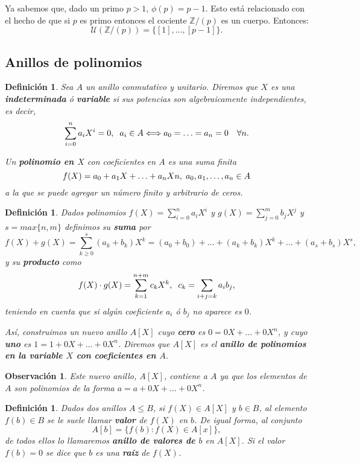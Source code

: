 \documentclass[12pt]{article}
\newtheorem{definition}[theorem]{Definición}
\newtheorem{observation}{Observación}[theorem]
\begin{document}
Ya sabemos que, dado un primo $p>1$, $\phi(p) = p-1$. Esto está relacionado con el hecho de que si $p$ es primo entonces el cociente $\mathbb{Z}/(p)$ es un cuerpo. Entonces: $$\mathcal{U}(\mathbb{Z}/(p)) = \lbrace [1], \ldots, [p-1] \rbrace.$$

\subsection{Anillos de polinomios}

\begin{definition}Sea $A$ un anillo conmutativo y unitario. Diremos que $X$ es una \textbf{indeterminada} ó \textbf{variable} si sus potencias son algebraicamente independientes, es decir, $$\sum_{i=0}^{n} a_{i}X^{i}=0, \hspace{0.2cm} a_{i}\in A \Longleftrightarrow a_0 = \ldots = a_n = 0  \quad\forall n.$$

Un \textbf{polinomio en $X$} con coeficientes en $A$ es una suma finita $$f(X) = a_0+a_1X+\ldots + a_nXn, \hspace{0.1cm} a_0, a_1, \ldots, a_n \in A$$ a la que se puede agregar un número finito y arbitrario de ceros.  
\end{definition}

\begin{definition}Dados polinomios $f(X) = \sum_{i=0}^n a_iX^i$ y $g(X) = \sum_{j=0}^m b_jX^j$ y $s = max\lbrace n,m \rbrace$ definimos su \textbf{suma} por $$f(X) +g(X) = \sum_{k\geq 0}^s(a_k+b_k)X^k = (a_0+b_0)+\ldots + (a_k+b_k)X^k + \ldots + (a_s+b_s)X^s,$$
y su \textbf{producto} como $$f(X)\cdot g(X) = \sum_{k=1}^{n+m}c_k X^k, \hspace{0.2cm} c_k = \sum_{i+j=k}a_ib_j,$$ teniendo en cuenta que si algún coeficiente $a_i$ ó $b_j$ no aparece es $0$.

Así, construimos un nuevo anillo $A[X]$ cuyo \textbf{cero} es $0 = 0X + \ldots + 0X^n$, y cuyo \textbf{uno} es $1 = 1+ 0X + \ldots + 0X^n$. Diremos que $A[X]$ es el \textbf{anillo de polinomios en la variable $X$ con coeficientes en $A$}.
\end{definition}

\begin{observation}Este nuevo anillo, $A[X]$, contiene a $A$ ya que los elementos de $A$ son polinomios de la forma $a = a+0X+\ldots + 0X^n$.
\end{observation}

\begin{definition}Dados dos anillos $A \leq B$, si $f(X) \in A[X]$ y $b \in B$, al elemento $f(b) \in B$ se le suele llamar \textbf{\textit{valor}} de $f(X)$ en $b$.  De igual forma, al conjunto $$A[b]= \lbrace f(b) : f(X) \in A[x] \rbrace,$$ de todos ellos lo llamaremos \textbf{\textit{anillo de valores de $b$}} en $A[X]$. Si el valor $f(b)=0$ se dice que $b$ es una \textbf{raíz} de $f(X)$. 
\end{definition}
\end{document}
